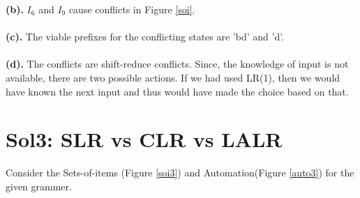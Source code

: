 \documentclass{article}
\begin{document}
\textbf{(b).} $I_6$ and $I_9$ cause conflicts in Figure \ref{soi}. \\ \\

\textbf{(c).} The viable prefixes for the conflicting states are 'bd' and 'd'. \\ \\

\textbf{(d).} The conflicts are shift-reduce conflicts. Since, the knowledge of input is not available, there are two possible actions. If we had used LR(1), then we would have known the next input and thus would have made the choice based on that.
\section*{Sol3: SLR vs CLR vs LALR}
Consider the Sets-of-items (Figure \ref{soi3}) and Automation(Figure \ref{auto3}) for the given grammer.
\end{document}
